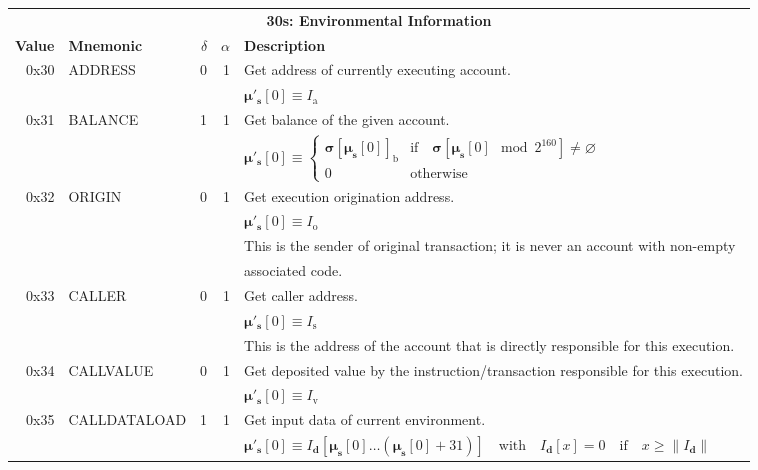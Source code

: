 \documentclass[9pt,oneside]{amsart}
\begin{document}
\begin{tabular*}{\columnwidth}[h]{rlrrl}
\toprule
\multicolumn{5}{c}{\textbf{30s: Environmental Information}} \vspace{5pt} \\
\textbf{Value} & \textbf{Mnemonic} & $\delta$ & $\alpha$ & \textbf{Description} \vspace{5pt} \\
0x30 & {\small ADDRESS} & 0 & 1 & Get address of currently executing account. \\
&&&& $\boldsymbol{\mu}'_{\mathbf{s}}[0] \equiv I_{\mathrm{a}}$ \\
\midrule
0x31 & {\small BALANCE} & 1 & 1 & Get balance of the given account. \\
&&&& $\boldsymbol{\mu}'_{\mathbf{s}}[0] \equiv \begin{cases}\boldsymbol{\sigma}[\boldsymbol{\mu}_{\mathbf{s}}[0]]_{\mathrm{b}}& \text{if} \quad \boldsymbol{\sigma}[\boldsymbol{\mu}_{\mathbf{s}}[0] \mod 2^{160}] \neq \varnothing\\0&\text{otherwise}\end{cases}$ \\
\midrule
0x32 & {\small ORIGIN} & 0 & 1 & Get execution origination address. \\
&&&& $\boldsymbol{\mu}'_{\mathbf{s}}[0] \equiv I_{\mathrm{o}}$ \\
&&&& This is the sender of original transaction; it is never an account with non-empty \\
&&&& associated code. \\
\midrule
0x33 & {\small CALLER} & 0 & 1 & Get caller address. \\
&&&& $\boldsymbol{\mu}'_{\mathbf{s}}[0] \equiv I_{\mathrm{s}}$ \\
&&&& This is the address of the account that is directly responsible for this execution. \\
\midrule
0x34 & {\small CALLVALUE} & 0 & 1 & Get deposited value by the instruction/transaction responsible for this execution. \\
&&&& $\boldsymbol{\mu}'_{\mathbf{s}}[0] \equiv I_{\mathrm{v}}$ \\
\midrule
0x35 & {\small CALLDATALOAD} & 1 & 1 & Get input data of current environment. \\
&&&& $\boldsymbol{\mu}'_{\mathbf{s}}[0] \equiv I_{\mathbf{d}}[ \boldsymbol{\mu}_{\mathbf{s}}[0] \dots (\boldsymbol{\mu}_{\mathbf{s}}[0] + 31) ] \quad \text{with} \quad I_{\mathbf{d}}[x] = 0 \quad \text{if} \quad x \geqslant \lVert I_{\mathbf{d}} \rVert$ \\

\end{tabular*}
\end{document}
